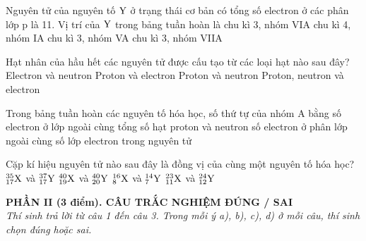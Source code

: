 \documentclass[11pt,a4paper]{article}
\begin{document}
\begin{ex}
Nguyên tử của nguyên tố $\ce{Y}$ ở trạng thái cơ bản có tổng số electron ở các phân lớp p là 11. Vị trí của $\ce{Y}$ trong bảng tuần hoàn là
\choice
{chu kì 3, nhóm VIA}
{chu kì 4, nhóm IA}
{chu kì 3, nhóm VA}
{\True chu kì 3, nhóm VIIA}
\end{ex}
\begin{ex}
Hạt nhân của hầu hết các nguyên tử được cấu tạo từ các loại hạt nào sau đây?
\choice
{Electron và neutron}
{Proton và electron}
{\True Proton và neutron}
{Proton, neutron và electron}
\end{ex}
\begin{ex}
Trong bảng tuần hoàn các nguyên tố hóa học, số thứ tự của nhóm A bằng
\choice
{\True số electron ở lớp ngoài cùng}
{tổng số hạt proton và neutron}
{số electron ở phân lớp ngoài cùng}
{số lớp electron trong nguyên tử}
\end{ex}
\begin{ex}
Cặp kí hiệu nguyên tử nào sau đây là đồng vị của cùng một nguyên tố hóa học?
\choice
{\True $^{35}_{17}\ce{X}$ và $^{37}_{17}\ce{Y}$}
{$^{40}_{19}\ce{X}$ và $^{40}_{20}\ce{Y}$}
{$^{16}_{8}\ce{X}$ và $^{14}_{7}\ce{Y}$}
{$^{23}_{11}\ce{X}$ và $^{24}_{12}\ce{Y}$}
\end{ex}
\vspace{4pt}
\noindent
{\color{mainGreen}\textbf{\large PHẦN II (3 điểm). CÂU TRẮC NGHIỆM ĐÚNG / SAI}}\\
\textit{\small Thí sinh trả lời từ câu 1 đến câu 3. Trong mỗi ý a), b), c), d) ở mỗi câu, thí sinh chọn đúng hoặc sai.}
\vspace{2pt}
\end{document}
